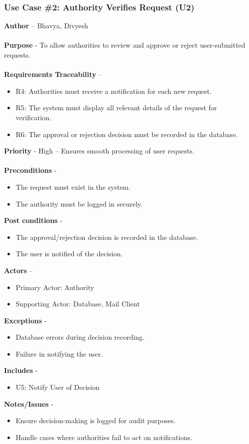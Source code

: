 \documentclass[a4paper,12pt]{article}
\begin{document}
 \subsubsection{Use Case \#2: Authority Verifies Request (U2)}
\textbf{Author} – Bhavya, Divyesh \\\\
\textbf{Purpose} - To allow authorities to review and approve or reject user-submitted requests. \\\\
\textbf{Requirements Traceability} – 
\begin{itemize} 
    \item R4: Authorities must receive a notification for each new request.
    \item R5: The system must display all relevant details of the request for verification.
    \item R6: The approval or rejection decision must be recorded in the database.
\end{itemize}
\textbf{Priority} - High – Ensures smooth processing of user requests. \\\\
\textbf{Preconditions} - 
\begin{itemize} 
    \item The request must exist in the system.
    \item The authority must be logged in securely.
\end{itemize}
\textbf{Post conditions} - 
\begin{itemize} 
    \item The approval/rejection decision is recorded in the database.
    \item The user is notified of the decision.
\end{itemize}
\textbf{Actors} – 
\begin{itemize} 
    \item Primary Actor: Authority
    \item Supporting Actor: Database, Mail Client
\end{itemize}
\textbf{Exceptions} - 
\begin{itemize} 
    \item Database errors during decision recording.
    \item Failure in notifying the user.
\end{itemize}
\textbf{Includes} - 
\begin{itemize} 
    \item U5: Notify User of Decision
\end{itemize}
\textbf{Notes/Issues} - 
\begin{itemize} 
    \item Ensure decision-making is logged for audit purposes.
    \item Handle cases where authorities fail to act on notifications.
\end{itemize}
\newpage
\end{document}

